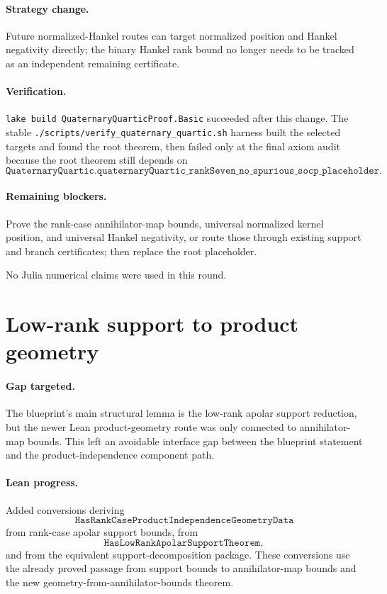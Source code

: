 \documentclass[11pt]{article}
\begin{document}
\paragraph{Strategy change.}
Future normalized-Hankel routes can target normalized position and Hankel
negativity directly; the binary Hankel rank bound no longer needs to be tracked
as an independent remaining certificate.

\paragraph{Verification.}
\texttt{lake build QuaternaryQuarticProof.Basic} succeeded after this change.
The stable \texttt{./scripts/verify\_quaternary\_quartic.sh} harness built the
selected targets and found the root theorem, then failed only at the final axiom
audit because the root theorem still depends on
\[
\texttt{QuaternaryQuartic.quaternaryQuartic\_rankSeven\_no\_spurious\_socp\_placeholder}.
\]

\paragraph{Remaining blockers.}
Prove the rank-case annihilator-map bounds, universal normalized kernel
position, and universal Hankel negativity, or route those through existing
support and branch certificates; then replace the root placeholder.

No Julia numerical claims were used in this round.

\section*{Low-rank support to product geometry}

\paragraph{Gap targeted.}
The blueprint's main structural lemma is the low-rank apolar support reduction,
but the newer Lean product-geometry route was only connected to annihilator-map
bounds.  This left an avoidable interface gap between the blueprint statement
and the product-independence component path.

\paragraph{Lean progress.}
Added conversions deriving
\[
\texttt{HasRankCaseProductIndependenceGeometryData}
\]
from rank-case apolar support bounds, from
\[
\texttt{HasLowRankApolarSupportTheorem},
\]
and from the equivalent support-decomposition package.  These conversions use
the already proved passage from support bounds to annihilator-map bounds and
the new geometry-from-annihilator-bounds theorem.
\end{document}
